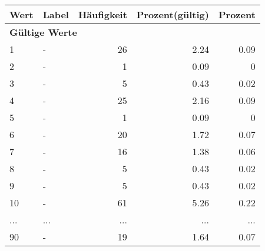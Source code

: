      \begin{longtable}{lXrrr}
     \toprule
     \textbf{Wert} & \textbf{Label} & \textbf{Häufigkeit} & \textbf{Prozent(gültig)} & \textbf{Prozent} \\
     \endhead
     \midrule
     \multicolumn{5}{l}{\textbf{Gültige Werte}}\\
        1 & \multicolumn{1}{X}{-} & %
          \num{26} &
          \num[round-mode=places,round-precision=2]{2.24} &
          \num[round-mode=places,round-precision=2]{0.09} \\
        2 & \multicolumn{1}{X}{-} & %
          \num{1} &
          \num[round-mode=places,round-precision=2]{0.09} &
          \num[round-mode=places,round-precision=2]{0} \\
        3 & \multicolumn{1}{X}{-} & %
          \num{5} &
          \num[round-mode=places,round-precision=2]{0.43} &
          \num[round-mode=places,round-precision=2]{0.02} \\
        4 & \multicolumn{1}{X}{-} & %
          \num{25} &
          \num[round-mode=places,round-precision=2]{2.16} &
          \num[round-mode=places,round-precision=2]{0.09} \\
        5 & \multicolumn{1}{X}{-} & %
          \num{1} &
          \num[round-mode=places,round-precision=2]{0.09} &
          \num[round-mode=places,round-precision=2]{0} \\
        6 & \multicolumn{1}{X}{-} & %
          \num{20} &
          \num[round-mode=places,round-precision=2]{1.72} &
          \num[round-mode=places,round-precision=2]{0.07} \\
        7 & \multicolumn{1}{X}{-} & %
          \num{16} &
          \num[round-mode=places,round-precision=2]{1.38} &
          \num[round-mode=places,round-precision=2]{0.06} \\
        8 & \multicolumn{1}{X}{-} & %
          \num{5} &
          \num[round-mode=places,round-precision=2]{0.43} &
          \num[round-mode=places,round-precision=2]{0.02} \\
        9 & \multicolumn{1}{X}{-} & %
          \num{5} &
          \num[round-mode=places,round-precision=2]{0.43} &
          \num[round-mode=places,round-precision=2]{0.02} \\
        10 & \multicolumn{1}{X}{-} & %
          \num{61} &
          \num[round-mode=places,round-precision=2]{5.26} &
          \num[round-mode=places,round-precision=2]{0.22} \\
       ... & ... & ... & ... & ... \\
        90 & \multicolumn{1}{X}{-} & %
          \num{19} &
          \num[round-mode=places,round-precision=2]{1.64} &
          \num[round-mode=places,round-precision=2]{0.07} \\


\end{longtable}
